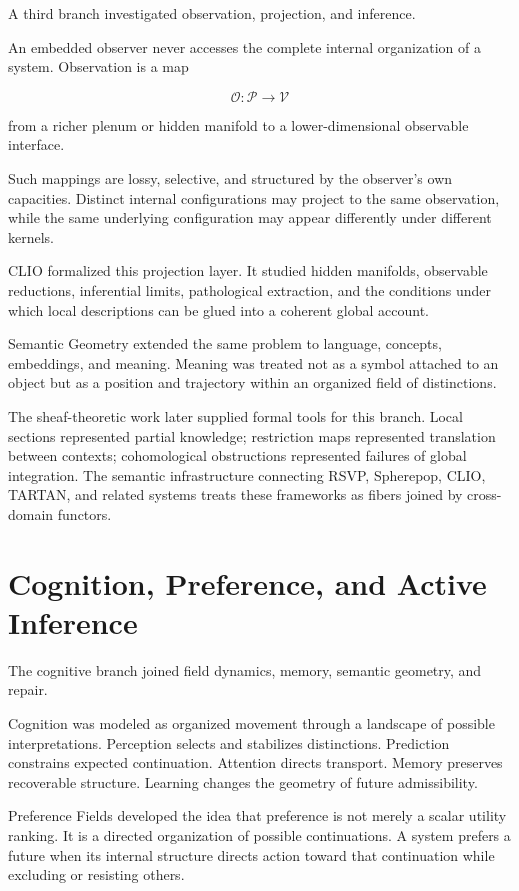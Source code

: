 \documentclass[11pt,oneside]{book}
\numberwithin{equation}{chapter}
\theoremstyle{definition}
\theoremstyle{plain}
\begin{document}
A third branch investigated observation, projection, and inference.

An embedded observer never accesses the complete internal organization of a
system. Observation is a map

\[
\mathcal O:
\mathcal P
\longrightarrow
\mathcal V
\]

from a richer plenum or hidden manifold to a lower-dimensional observable
interface.

Such mappings are lossy, selective, and structured by the observer's own
capacities. Distinct internal configurations may project to the same
observation, while the same underlying configuration may appear differently
under different kernels.

CLIO formalized this projection layer. It studied hidden manifolds,
observable reductions, inferential limits, pathological extraction, and the
conditions under which local descriptions can be glued into a coherent
global account.

Semantic Geometry extended the same problem to language, concepts,
embeddings, and meaning. Meaning was treated not as a symbol attached to an
object but as a position and trajectory within an organized field of
distinctions.

The sheaf-theoretic work later supplied formal tools for this branch. Local
sections represented partial knowledge; restriction maps represented
translation between contexts; cohomological obstructions represented
failures of global integration. The semantic infrastructure connecting
RSVP, Spherepop, CLIO, TARTAN, and related systems treats these frameworks
as fibers joined by cross-domain functors.

\section{Cognition, Preference, and Active Inference}

The cognitive branch joined field dynamics, memory, semantic geometry, and
repair.

Cognition was modeled as organized movement through a landscape of possible
interpretations. Perception selects and stabilizes distinctions. Prediction
constrains expected continuation. Attention directs transport. Memory
preserves recoverable structure. Learning changes the geometry of future
admissibility.

Preference Fields developed the idea that preference is not merely a scalar
utility ranking. It is a directed organization of possible continuations. A
system prefers a future when its internal structure directs action toward
that continuation while excluding or resisting others.
\end{document}

